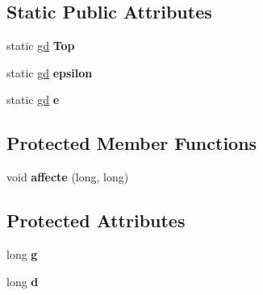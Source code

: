 \subsection*{Static Public Attributes}
\begin{DoxyCompactItemize}
\item 
\mbox{\label{classmmgd_1_1gd_a406d8038e331c71ec13b5dd00f134207}} 
static \mbox{\hyperlink{classmmgd_1_1gd}{gd}} {\bfseries Top}
\item 
\mbox{\label{classmmgd_1_1gd_a066162305c8f563ea3e3bab929c6e94a}} 
static \mbox{\hyperlink{classmmgd_1_1gd}{gd}} {\bfseries epsilon}
\item 
\mbox{\label{classmmgd_1_1gd_afd7496b861bcfa4313382867e16f5ff6}} 
static \mbox{\hyperlink{classmmgd_1_1gd}{gd}} {\bfseries e}
\end{DoxyCompactItemize}
\subsection*{Protected Member Functions}
\begin{DoxyCompactItemize}
\item 
\mbox{\label{classmmgd_1_1gd_a9f0cbddb58f4e9e1c89d03263589af88}} 
void {\bfseries affecte} (long, long)
\end{DoxyCompactItemize}
\subsection*{Protected Attributes}
\begin{DoxyCompactItemize}
\item 
\mbox{\label{classmmgd_1_1gd_a4d509ea069575b9c3c4719ebfbfdee59}} 
long {\bfseries g}
\item 
\mbox{\label{classmmgd_1_1gd_ab00168800630d031f671ad7057b05aba}} 
long {\bfseries d}
\end{DoxyCompactItemize}
